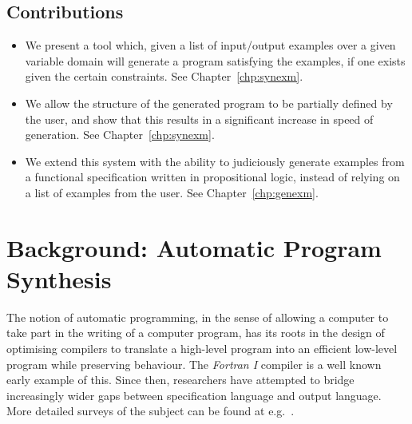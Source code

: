 \documentclass[a4paper,twoside,notitlepage]{report}
\begin{document}
\section{Contributions}
\begin{itemize}
    \item We present a tool which, given a list of input/output examples 
    over a given variable domain will generate a program satisfying the
    examples, if one exists given the certain constraints. See 
    Chapter~\ref{chp:synexm}.

    \item We allow the structure of the generated program to be partially 
    defined by the user, and show that this results in a significant increase
    in speed of generation. See Chapter~\ref{chp:synexm}.

    \item We extend this system with the ability to judiciously generate 
    examples from a functional specification written in propositional
    logic, instead of relying on a list of examples from the user. See
    Chapter~\ref{chp:genexm}.

\begin{comment}
    \item Particularising the above to the generation of programs 
    involving loops, we allow a \emph{loop invariant} and \emph{variant}
    to be specified by the user, and use this to generate the loop body
    separately from the rest of the program, also resulting in an 
    increase in speed of generation. See Chapter~\ref{chp:gensub}.
\end{comment}
\end{itemize}

\chapter{Background: Automatic Program Synthesis} \label{chp:bkgsyn}

The notion of automatic programming, in the sense of 
allowing a computer to take part in the writing of a computer program, has its 
roots in the design of optimising compilers to translate a high-level program 
into an efficient low-level program while preserving behaviour. The 
\emph{Fortran I} compiler\cite{fortran} is a well known early example of this. 
Since then, researchers have attempted to bridge increasingly wider gaps 
between specification language and output language. More detailed surveys of 
the subject can be found at e.g.\ 
\cite{goldberg86}\cite{deville94}\cite{basin04}.
\end{document}
